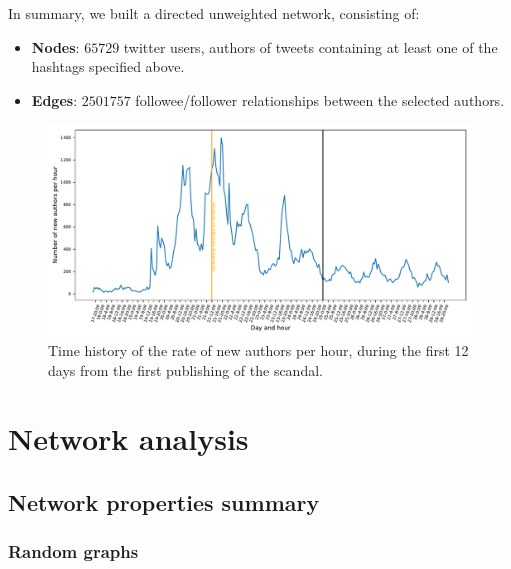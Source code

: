 \documentclass[11pt, twoside]{report}
\begin{document}
    In summary, we built a directed unweighted network, consisting of:

    \begin{itemize}
    \item \textbf{Nodes}: $65729$ twitter users, authors of tweets containing at least one of the hashtags specified above.

    \item \textbf{Edges}: $2501757$ followee/follower relationships between the selected authors.
    \end{itemize}


    
    \begin{figure}[htbp]
      \centering
\includegraphics[width=\textwidth]{../../scripts/network_analysis/imgs/time_history.pdf}
      \caption{Time history of the rate of new authors per hour, during the first 12 days from the first publishing of the scandal.}
      \label{fig:time_history}
    \end{figure}



    
    \chapter{Network analysis}

\section{Network properties summary} 

\begin{table}[htbp]
  \centering

\end{table}

\subsection{Random graphs}
\end{document}
